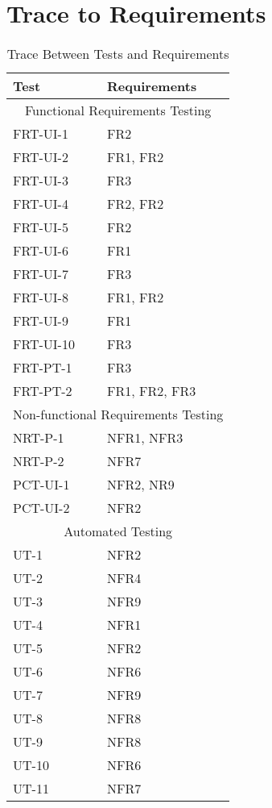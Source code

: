 \documentclass[12pt, titlepage]{article}
\begin{document}
\section{Trace to Requirements}
\begin{table}[H]
			\begin{tabularx}{\textwidth}{XX}
				\toprule
				Test & Requirements \\
				\midrule
				\multicolumn{2}{c}{Functional Requirements Testing} \\
				\midrule
				FRT-UI-1 & FR2 \\
				FRT-UI-2 & FR1, FR2 \\
				FRT-UI-3 & FR3 \\
				FRT-UI-4 & FR2, FR2 \\
				FRT-UI-5 & FR2 \\
				FRT-UI-6 & FR1 \\
				FRT-UI-7 & FR3 \\
				FRT-UI-8 & FR1, FR2 \\
				FRT-UI-9 & FR1 \\
				FRT-UI-10 & FR3 \\
				FRT-PT-1 & FR3 \\
				FRT-PT-2 & FR1, FR2, FR3 \\
				\midrule
				\multicolumn{2}{c}{Non-functional Requirements Testing} \\
				\midrule
				NRT-P-1 & NFR1, NFR3 \\
				NRT-P-2 & NFR7 \\
				PCT-UI-1 & NFR2, NR9 \\
				PCT-UI-2 & NFR2 \\
				\midrule
				\multicolumn{2}{c}{Automated Testing} \\
				\midrule
				UT-1 & NFR2 \\
				UT-2 & NFR4 \\
				UT-3 & NFR9 \\
				UT-4 & NFR1 \\
				UT-5 & NFR2 \\
				UT-6 & NFR6 \\
				UT-7 & NFR9 \\
				UT-8 & NFR8 \\
				UT-9 & NFR8 \\
				UT-10 & NFR6 \\
				UT-11 & NFR7 \\
				\bottomrule
			\end{tabularx}

			\caption{Trace Between Tests and Requirements}
			\label{Table}
		\end{table}
\end{document}
